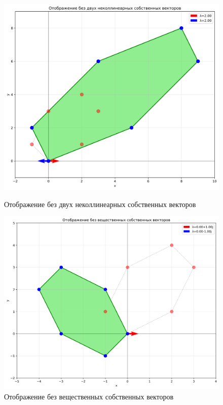 \begin{figure}[h]
\begin{minipage}{0.31\textwidth}
\includegraphics[width=\textwidth]{images/task1/single_eigenvector.png}
\caption{Отображение без двух неколлинеарных собственных векторов}
\label{fig:single_eigenvector}
\end{minipage}
\hfill
\begin{minipage}{0.31\textwidth}
\centering
\includegraphics[width=\textwidth]{images/task1/complex_eigenvalues.png}
\caption{Отображение без вещественных собственных векторов}
\label{fig:complex_eigenvalues}
\end{minipage}
\end{figure}

